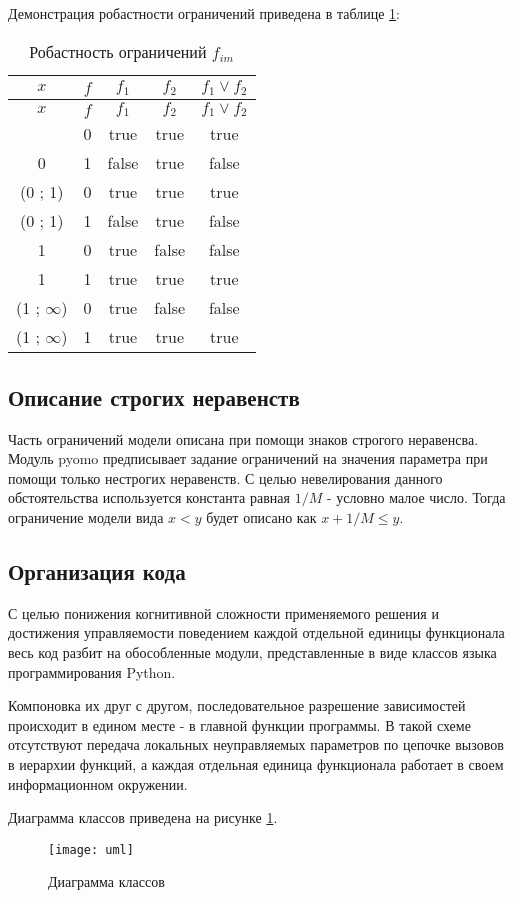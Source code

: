 Демонстрация робастности ограничений приведена в таблице \ref{tab:fim}:
\begin{longtable}{|c|c|c|c|c|}
  \caption{Робастность ограничений $f_{im}$}
  \label{tab:fim}\\   
  \hline
  $x$ & $f$ & $f_{1}$ & $f_{2}$ & $f_{1} \vee f_{2}$ \\
  \endfirsthead
  $x$ & $f$ & $f_{1}$ & $f_{2}$ & $f_{1} \vee f_{2}$ \\
  \endhead
  \endfoot
  \hline
  0              & 0 & true  & true  & true \\
  \hline
  0              & 1 & false & true  & false \\
  \hline
  (0 ; 1)        & 0 & true  & true  & true \\
  \hline
  (0 ; 1)        & 1 & false & true  & false \\
  \hline
  1              & 0 & true  & false & false \\
  \hline
  1              & 1 & true  & true  & true \\
  \hline
  (1 ; $\infty$) & 0 & true  & false & false \\
  \hline
  (1 ; $\infty$) & 1 & true  & true  & true \\
  \hline
\end{longtable}

\subsection*{Описание строгих неравенств}
Часть ограничений модели описана при помощи знаков строгого неравенсва. Модуль pyomo предписывает задание ограничений на значения параметра при помощи только нестрогих неравенств. С целью невелирования данного обстоятельства используется константа равная $1 / M$ - условно малое число. Тогда ограничение модели вида $x < y$ будет описано как $x + 1 / M \le y$.

\subsection*{Организация кода}
С целью понижения когнитивной сложности применяемого решения и достижения управляемости поведением каждой отдельной единицы функционала весь код разбит на обособленные модули, представленные в виде классов языка программирования Python.

Компоновка их друг с другом, последовательное разрешение зависимостей происходит в едином месте - в главной функции программы. В такой схеме отсутствуют передача локальных неуправляемых параметров по цепочке вызовов в иерархии функций, а каждая отдельная единица функционала работает в своем информационном окружении.

Диаграмма классов приведена на рисунке \ref{fig:uml}.

\begin{figure}[H]
    \centering
    \texttt{[image: uml]}
    \caption{Диаграмма классов}
    \label{fig:uml}
\end{figure}
